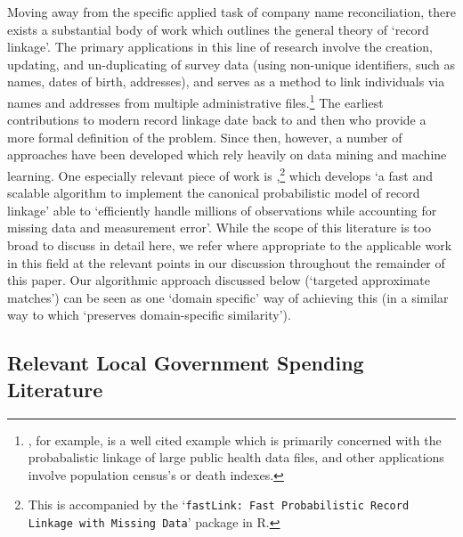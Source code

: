 \documentclass[11pt]{article}
\begin{document}
Moving away from the specific applied task of company name reconciliation, there exists a substantial body of work which outlines the general theory of `record linkage'. The primary applications in this line of research involve the creation, updating, and un-duplicating of survey data (using non-unique identifiers, such as names, dates of birth, addresses), and serves as a method to link individuals via names and addresses from multiple administrative files.\footnote{\cite{SIM:SIM4780140510}, for example, is a well cited example which is primarily concerned with the probabalistic linkage of large public health data files, and other applications involve population census's or death indexes.} The earliest contributions to modern record linkage date back to \cite{Newcombe954} and then \cite{doi:10.1080/01621459.1969.10501049} who provide a more formal definition of the problem. Since then, however, a number of approaches have been developed which rely heavily on data mining and machine learning. One especially relevant piece of work is \cite{imai2017},\footnote{This is accompanied by the `\texttt{fastLink: Fast Probabilistic Record Linkage with Missing Data}' package in R.} which develops `a fast and
scalable algorithm to implement the canonical probabilistic model of record linkage' able to `efficiently handle millions of observations while accounting for missing data and measurement error'. While the scope of this literature is too broad to discuss in detail here, we refer where appropriate to the applicable work in this field at the relevant points in our discussion throughout the remainder of this paper. Our algorithmic approach discussed below (`targeted approximate matches') can be seen as one `domain specific' way of achieving this (in a similar way to \cite{1192377} which `preserves domain-specific similarity').

\subsection{Relevant Local Government Spending Literature}
\end{document}
